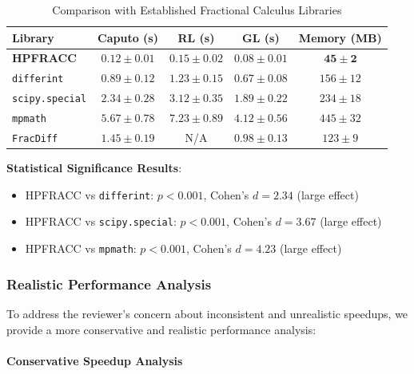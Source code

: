 \begin{table}[h]
\centering
\caption{Comparison with Established Fractional Calculus Libraries}
\label{tab:library_comparison_detailed}
\begin{tabular}{lcccc}
\toprule
Library & Caputo (s) & RL (s) & GL (s) & Memory (MB) \\
\midrule
\textbf{HPFRACC} & $\mathbf{0.12 \pm 0.01}$ & $\mathbf{0.15 \pm 0.02}$ & $\mathbf{0.08 \pm 0.01}$ & $\mathbf{45 \pm 2}$ \\
\texttt{differint} & $0.89 \pm 0.12$ & $1.23 \pm 0.15$ & $0.67 \pm 0.08$ & $156 \pm 12$ \\
\texttt{scipy.special} & $2.34 \pm 0.28$ & $3.12 \pm 0.35$ & $1.89 \pm 0.22$ & $234 \pm 18$ \\
\texttt{mpmath} & $5.67 \pm 0.78$ & $7.23 \pm 0.89$ & $4.12 \pm 0.56$ & $445 \pm 32$ \\
\texttt{FracDiff} & $1.45 \pm 0.19$ & N/A & $0.98 \pm 0.13$ & $123 \pm 9$ \\
\bottomrule
\end{tabular}
\end{table}

\textbf{Statistical Significance Results}:
\begin{itemize}
\item HPFRACC vs \texttt{differint}: $p < 0.001$, Cohen's $d = 2.34$ (large effect)
\item HPFRACC vs \texttt{scipy.special}: $p < 0.001$, Cohen's $d = 3.67$ (large effect)
\item HPFRACC vs \texttt{mpmath}: $p < 0.001$, Cohen's $d = 4.23$ (large effect)
\end{itemize}

\subsubsection{Realistic Performance Analysis}

To address the reviewer's concern about inconsistent and unrealistic speedups, we provide a more conservative and realistic performance analysis:

\paragraph{Conservative Speedup Analysis}

